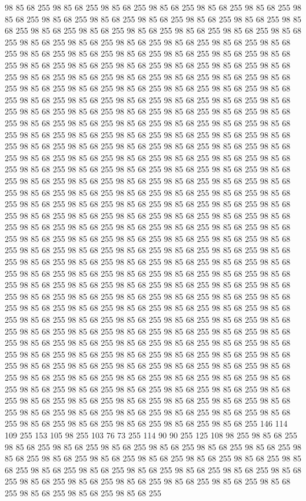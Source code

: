 98 85 68 255 98 85 68 255 98 85 68 255 98 85 68 255 98 85 68 255 98 85 68 255 98 85 68 255 98 85 68 255 98 85 68 255 98 85 68 255 98 85 68 255 98 85 68 255 98 85 68 255 98 85 68 255 98 85 68 255 98 85 68 255 98 85 68 255 98 85 68 255 98 85 68 255 98 85 68 255 98 85 68 255 98 85 68 255 98 85 68 255 98 85 68 255 98 85 68 255 98 85 68 255 98 85 68 255 98 85 68 255 98 85 68 255 98 85 68 255 98 85 68 255 98 85 68 255 98 85 68 255 98 85 68 255 98 85 68 255 98 85 68 255 98 85 68 255 98 85 68 255 98 85 68 255 98 85 68 255 98 85 68 255 98 85 68 255 98 85 68 255 98 85 68 255 98 85 68 255 98 85 68 255 98 85 68 255 98 85 68 255 98 85 68 255 98 85 68 255 98 85 68 255 98 85 68 255 98 85 68 255 98 85 68 255 98 85 68 255 98 85 68 255 98 85 68 255 98 85 68 255 98 85 68 255 98 85 68 255 98 85 68 255 98 85 68 255 98 85 68 255 98 85 68 255
98 85 68 255 98 85 68 255 98 85 68 255 98 85 68 255 98 85 68 255 98 85 68 255 98 85 68 255 98 85 68 255 98 85 68 255 98 85 68 255 98 85 68 255 98 85 68 255 98 85 68 255 98 85 68 255 98 85 68 255 98 85 68 255 98 85 68 255 98 85 68 255 98 85 68 255 98 85 68 255 98 85 68 255 98 85 68 255 98 85 68 255 98 85 68 255 98 85 68 255 98 85 68 255 98 85 68 255 98 85 68 255 98 85 68 255 98 85 68 255 98 85 68 255 98 85 68 255 98 85 68 255 98 85 68 255 98 85 68 255 98 85 68 255 98 85 68 255 98 85 68 255 98 85 68 255 98 85 68 255 98 85 68 255 98 85 68 255 98 85 68 255 98 85 68 255 98 85 68 255 98 85 68 255 98 85 68 255 98 85 68 255 98 85 68 255 98 85 68 255 98 85 68 255 98 85 68 255 98 85 68 255 98 85 68 255 98 85 68 255 98 85 68 255 98 85 68 255 98 85 68 255 98 85 68 255 98 85 68 255 98 85 68 255 98 85 68 255 98 85 68 255 98 85 68 255
98 85 68 255 98 85 68 255 98 85 68 255 98 85 68 255 98 85 68 255 98 85 68 255 98 85 68 255 98 85 68 255 98 85 68 255 98 85 68 255 98 85 68 255 98 85 68 255 98 85 68 255 98 85 68 255 98 85 68 255 98 85 68 255 98 85 68 255 98 85 68 255 98 85 68 255 98 85 68 255 98 85 68 255 98 85 68 255 98 85 68 255 98 85 68 255 98 85 68 255 98 85 68 255 98 85 68 255 98 85 68 255 98 85 68 255 98 85 68 255 98 85 68 255 98 85 68 255 98 85 68 255 98 85 68 255 98 85 68 255 98 85 68 255 98 85 68 255 98 85 68 255 98 85 68 255 98 85 68 255 98 85 68 255 98 85 68 255 98 85 68 255 98 85 68 255 98 85 68 255 98 85 68 255 98 85 68 255 98 85 68 255 98 85 68 255 98 85 68 255 98 85 68 255 98 85 68 255 98 85 68 255 98 85 68 255 98 85 68 255 98 85 68 255 98 85 68 255 98 85 68 255 98 85 68 255 98 85 68 255 98 85 68 255 98 85 68 255 98 85 68 255 98 85 68 255
98 85 68 255 98 85 68 255 98 85 68 255 98 85 68 255 98 85 68 255 98 85 68 255 98 85 68 255 98 85 68 255 98 85 68 255 98 85 68 255 98 85 68 255 98 85 68 255 98 85 68 255 98 85 68 255 98 85 68 255 98 85 68 255 98 85 68 255 98 85 68 255 98 85 68 255 98 85 68 255 98 85 68 255 98 85 68 255 98 85 68 255 98 85 68 255 98 85 68 255 98 85 68 255 98 85 68 255 98 85 68 255 98 85 68 255 98 85 68 255 146 114 109 255 153 105 98 255 103 76 73 255 114 90 90 255 125 108 98 255 98 85 68 255 98 85 68 255 98 85 68 255 98 85 68 255 98 85 68 255 98 85 68 255 98 85 68 255 98 85 68 255 98 85 68 255 98 85 68 255 98 85 68 255 98 85 68 255 98 85 68 255 98 85 68 255 98 85 68 255 98 85 68 255 98 85 68 255 98 85 68 255 98 85 68 255 98 85 68 255 98 85 68 255 98 85 68 255 98 85 68 255 98 85 68 255 98 85 68 255 98 85 68 255 98 85 68 255 98 85 68 255 98 85 68 255